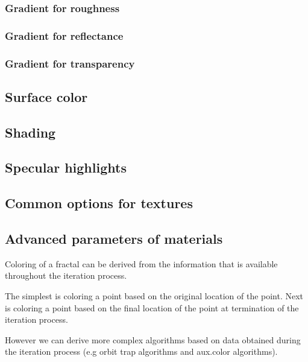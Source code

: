 \subsubsection{Gradient for roughness}\label{materials-roughness-gradient}

\subsubsection{Gradient for reflectance}\label{materials-reflectance-gradient}

\subsubsection{Gradient for transparency}\label{materials-transparency-gradient}

\subsection{Surface color}\label{materials-surface_color}

\subsection{Shading}\label{materials-shading}

\subsection{Specular highlights}\label{materials-specular}

\subsection{Common options for textures}\label{materials-textures}

\subsection{Advanced parameters of materials}\label{materials-advanced}

Coloring of a fractal can be derived from the information that is available throughout the iteration process.

The simplest is coloring a point based on the original location of the point.
Next is coloring a point based on the final location of the point at termination of the iteration process.

However we can derive more complex algorithms based on data obtained during the iteration process (e.g orbit trap algorithms and aux.color algorithms).

